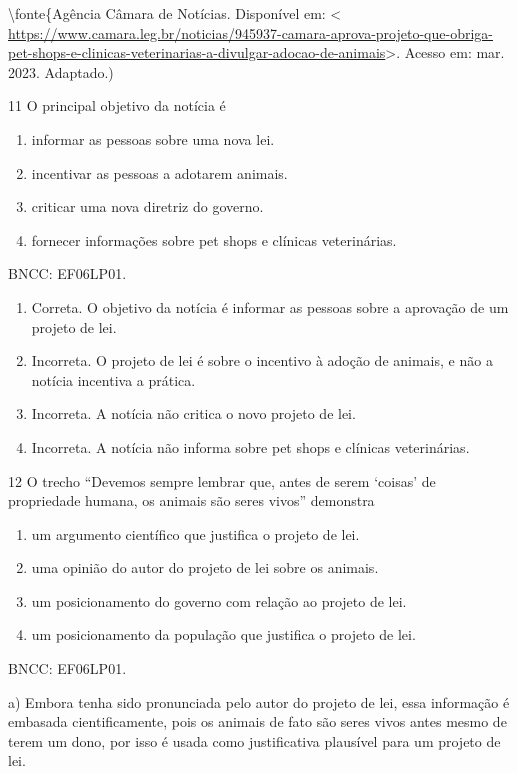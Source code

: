 {\textbackslash fonte\{Agência Câmara de Notícias. Disponível em:
\textless{}
\url{https://www.camara.leg.br/noticias/945937-camara-aprova-projeto-que-obriga-pet-shops-e-clinicas-veterinarias-a-divulgar-adocao-de-animais}\textgreater.
Acesso em: mar. 2023. Adaptado.)

\num{11} O principal objetivo da notícia é

\begin{enumerate}
\def\labelenumi{\alph{enumi})}
\item
  informar as pessoas sobre uma nova lei.
\item
  incentivar as pessoas a adotarem animais.
\item
  criticar uma nova diretriz do governo.
\item
  fornecer informações sobre pet shops e clínicas veterinárias.
\end{enumerate}

BNCC: EF06LP01.

\begin{enumerate}
\def\labelenumi{\alph{enumi})}
\item
  Correta. O objetivo da notícia é informar as pessoas sobre a aprovação
  de um projeto de lei.
\item
  Incorreta. O projeto de lei é sobre o incentivo à adoção de animais, e
  não a notícia incentiva a prática.
\item
  Incorreta. A notícia não critica o novo projeto de lei.
\item
  Incorreta. A notícia não informa sobre pet shops e clínicas
  veterinárias.
\end{enumerate}

\num{12} O trecho ``Devemos sempre lembrar que, antes de serem `coisas'
de propriedade humana, os animais são seres vivos'' demonstra

\begin{enumerate}
\def\labelenumi{\alph{enumi})}
\item
  um argumento científico que justifica o projeto de lei.
\item
  uma opinião do autor do projeto de lei sobre os animais.
\item
  um posicionamento do governo com relação ao projeto de lei.
\item
  um posicionamento da população que justifica o projeto de lei.
\end{enumerate}

BNCC: EF06LP01.

a) Embora tenha sido pronunciada pelo autor do projeto de lei, essa
informação é embasada cientificamente, pois os animais de fato são seres
vivos antes mesmo de terem um dono, por isso é usada como justificativa
plausível para um projeto de lei.

}
